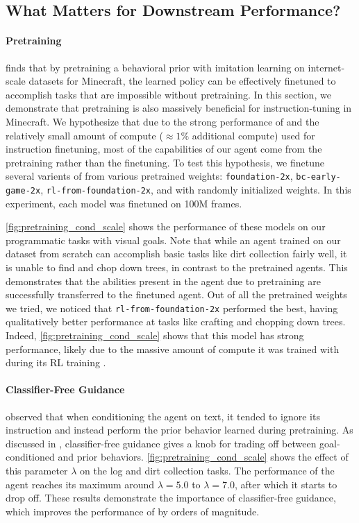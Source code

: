 \subsection{What Matters for Downstream Performance?}

\paragraph*{Pretraining} \citet{baker2022vpt} finds that by pretraining a behavioral prior with imitation learning on internet-scale datasets for Minecraft, the learned policy can be effectively finetuned to accomplish tasks that are impossible without pretraining. In this section, we demonstrate that pretraining is also massively beneficial for instruction-tuning in Minecraft. We hypothesize that due to the strong performance of \agentname{} and the relatively small amount of compute ($\approx 1\%$ additional compute) used for instruction finetuning, most of the capabilities of our agent come from the pretraining rather than the finetuning. To test this hypothesis, we finetune several varients of \agentname{} from various pretrained weights: \texttt{foundation-2x}, \texttt{bc-early-game-2x}, \texttt{rl-from-foundation-2x}, and with randomly initialized weights. In this experiment, each model was finetuned on 100M frames.

\autoref{fig:pretraining_cond_scale} shows the performance of these models on our programmatic tasks with visual goals. Note that while an agent trained on our dataset from scratch can accomplish basic tasks like dirt collection fairly well, it is unable to find and chop down trees, in contrast to the pretrained agents. This demonstrates that the abilities present in the agent due to pretraining are successfully transferred to the finetuned agent. Out of all the pretrained weights we tried, we noticed that \texttt{rl-from-foundation-2x} performed the best, having qualitatively better performance at tasks like crafting and chopping down trees. Indeed, \autoref{fig:pretraining_cond_scale} shows that this model has strong performance, likely due to the massive amount of compute it was trained with during its RL training \citep{baker2022vpt}.

\paragraph*{Classifier-Free Guidance} \label{par:cfg} \citet{baker2022vpt} observed that when conditioning the agent on text, it tended to ignore its instruction and instead perform the prior behavior learned during pretraining. As discussed in , classifier-free guidance \citep{cfg} gives a knob for trading off between goal-conditioned and prior behaviors. \autoref{fig:pretraining_cond_scale} shows the effect of this parameter $\lambda$ on the log and dirt collection tasks. The performance of the agent reaches its maximum around $\lambda = 5.0$ to $\lambda = 7.0$, after which it starts to drop off. These results demonstrate the importance of classifier-free guidance, which improves the performance of \agentname{} by orders of magnitude.

